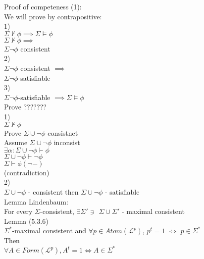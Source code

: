 \documentclass[12pt,oneside,notitlepage]{book}
\theoremstyle{definition}
\newcommand{\Lp}{\mathcal{L}^p}
\begin{document}
Proof of competeness (1): \\
We will prove by contrapositive: \\
1) \\
$\Sigma \not \vdash \phi \implies \Sigma \vDash \phi$ \\
$\Sigma \not \vdash \phi \implies$ \\
$\Sigma{\neg \phi}$ consistent \\
2) \\
$\Sigma{\neg \phi}$ consistent $\implies$ \\
$\Sigma{\neg \phi}$-satisfiable \\
3) \\
$\Sigma{\neg \phi}$-satisfiable $\implies \Sigma \vDash \phi$ \\

Prove ??????? \\
1) \\
$\Sigma \not \vdash \phi$ \\ 
Prove $\Sigma \cup {\neg \phi}$ consistnet \\
Assume $\Sigma \cup {\neg \phi} $ inconsist \\
$\exists \alpha : \Sigma \cup { \neg \phi} \vdash \phi$ \\
$\Sigma \cup { \neg \phi} \vdash \neg \phi$ \\
$\Sigma \vdash \phi (\neg -)$ \\
(contradiction) \\
2) \\
$\Sigma \cup { \neg \phi}$ - consistent then $\Sigma \cup { \neg \phi}$ - satisfiable \\

Lemma Lindenbaum: \\
For every $\Sigma$-consistent, $\exists \Sigma' \ni$ $\Sigma \cup \Sigma'$ - maximal consistent \\
 
Lemma (5.3.6) \\
$\Sigma^*$-maximal consistent and $\forall p \in Atom(\Lp)$, $p^t = 1$ $\iff$ $p \in \Sigma^*$ \\
Then \\
$\forall A \in Form(\Lp), A^t = 1 \iff A \in \Sigma^*$ \\
\end{document}

